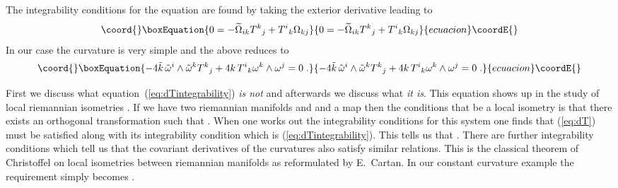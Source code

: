 \documentclass[a4paper,12pt]{article}
\providecommand{\Mtil}{\widetilde{M}}
\providecommand{\Tij}{T^{i}{}_{j}}
\providecommand{\Tik}{T^{i}{}_{k}}
\providecommand{\Tkj}{T^{k}{}_{j}}
\providecommand{\ktil}{\tilde{k}}
\providecommand{\omegatil}{\tilde{\omega}}
\begin{document}
The integrability conditions for the \coordHE{} equation are found by taking the 
exterior derivative leading to
\begin{equation}\coord{}\boxEquation{
    0 = - \widetilde{\Omega}_{ik}\Tkj + \Tik\Omega_{kj}
    \label{eq:dTintegrability}
}{
    0 = - \widetilde{\Omega}_{ik}\Tkj + \Tik\Omega_{kj}
    }{ecuacion}\coordE{}\end{equation}
In our case the curvature is very simple and the above reduces to 
\begin{equation}\coord{}\boxEquation{
    -4\ktil\, \omegatil^{i}\wedge\omegatil^{k}\Tkj + 4k\, \Tik 
    \omega^{k}\wedge\omega^{j}=0\;.
    \label{eq:kktil}
}{
    -4\ktil\, \omegatil^{i}\wedge\omegatil^{k}\Tkj + 4k\, \Tik 
    \omega^{k}\wedge\omega^{j}=0\;.
    }{ecuacion}\coordE{}\end{equation}


First we discuss what equation~(\ref{eq:dTintegrability}) \emph{is
not} and afterwards we discuss what \emph{it is}.  This equation shows
up in the study of local riemannian isometries \cite{BCG3}.  If we
have two riemannian manifolds \coordHE{} and \myHighlight{$\Mtil$}\coordHE{} and a map \myHighlight{$f:M\to\Mtil$}\coordHE{}
then the conditions that \coordHE{} be a local isometry is that there exists
an orthogonal transformation \coordHE{} such that
\myHighlight{$\omegatil^{i}=\Tij\omega^{j}$}\coordHE{}.  When one works out the integrability
conditions for this system one finds that (\ref{eq:dT}) must be
satisfied along with its integrability condition which is
(\ref{eq:dTintegrability}).  This tells us that
\coordHE{}.  There are further integrability conditions which tell us
that the covariant derivatives of the curvatures also satisfy similar
relations.  This is the classical theorem of Christoffel on local
isometries between riemannian manifolds as reformulated by E.~Cartan. 
In our constant curvature example the requirement simply becomes
\myHighlight{$k=\ktil$}\coordHE{}.
\end{document}
